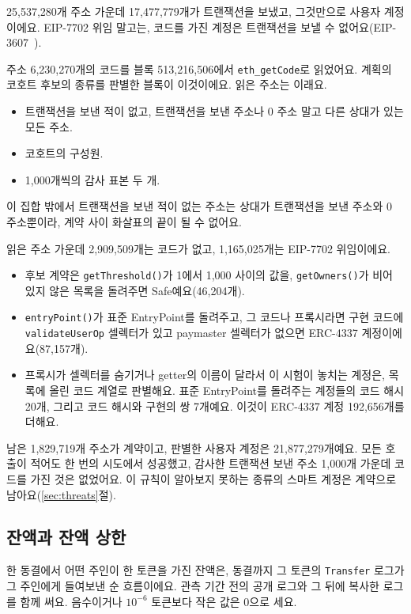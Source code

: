 25,537,280개 주소 가운데 17,477,779개가 트랜잭션을 보냈고, 그것만으로 사용자 계정이에요. EIP-7702 위임 말고는, 코드를 가진 계정은 트랜잭션을 보낼 수 없어요(EIP-3607~\cite{feist2021eip3607}).

주소 6,230,270개의 코드를 블록 513,216,506에서 \texttt{eth\_getCode}로 읽었어요. 계획의 코호트 후보의 종류를 판별한 블록이 이것이에요. 읽은 주소는 이래요.
\begin{itemize}
\item 트랜잭션을 보낸 적이 없고, 트랜잭션을 보낸 주소나 0 주소 말고 다른 상대가 있는 모든 주소.
\item 코호트의 구성원.
\item 1,000개씩의 감사 표본 두 개.
\end{itemize}
이 집합 밖에서 트랜잭션을 보낸 적이 없는 주소는 상대가 트랜잭션을 보낸 주소와 0 주소뿐이라, 계약 사이 화살표의 끝이 될 수 없어요.

읽은 주소 가운데 2,909,509개는 코드가 없고, 1,165,025개는 EIP-7702 위임이에요.
\begin{itemize}
\item 후보 계약은 \texttt{getThreshold()}가 1에서 1,000 사이의 값을, \texttt{getOwners()}가 비어 있지 않은 목록을 돌려주면 Safe예요(46,204개).
\item \texttt{entryPoint()}가 표준 EntryPoint를 돌려주고, 그 코드나 프록시라면 구현 코드에 \texttt{validateUserOp} 셀렉터가 있고 paymaster 셀렉터가 없으면 ERC-4337 계정이에요(87,157개).
\item 프록시가 셀렉터를 숨기거나 getter의 이름이 달라서 이 시험이 놓치는 계정은, 목록에 올린 코드 계열로 판별해요. 표준 EntryPoint를 돌려주는 계정들의 코드 해시 20개, 그리고 코드 해시와 구현의 쌍 7개예요. 이것이 ERC-4337 계정 192,656개를 더해요.
\end{itemize}
남은 1,829,719개 주소가 계약이고, 판별한 사용자 계정은 21,877,279개예요. 모든 호출이 적어도 한 번의 시도에서 성공했고, 감사한 트랜잭션 보낸 주소 1,000개 가운데 코드를 가진 것은 없었어요. 이 규칙이 알아보지 못하는 종류의 스마트 계정은 계약으로 남아요(\ref{sec:threats}절).

\subsection{잔액과 잔액 상한}
\label{sec:balances}

한 동결에서 어떤 주인이 한 토큰을 가진 잔액은, 동결까지 그 토큰의 \texttt{Transfer} 로그가 그 주인에게 들여보낸 순 흐름이에요. 관측 기간 전의 공개 로그와 그 뒤에 복사한 로그를 함께 써요. 음수이거나 $10^{-6}$ 토큰보다 작은 값은 0으로 세요.

